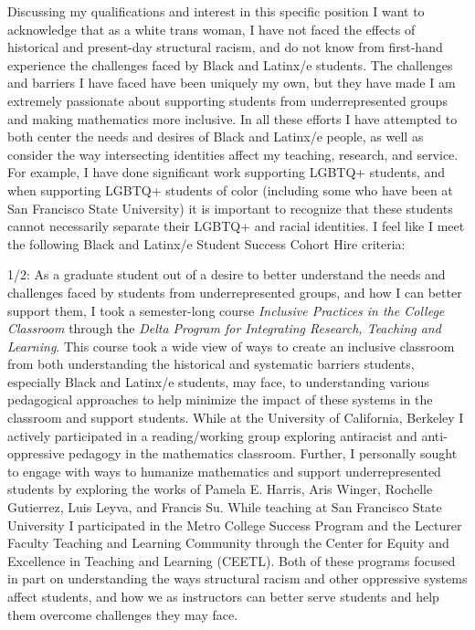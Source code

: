 \documentclass[11pt]{article}
\begin{document}
Discussing my qualifications and interest in this specific position I want to acknowledge that as a white trans woman, I have not faced the effects of historical and present-day structural racism, and do not know from first-hand experience the challenges faced by Black and Latinx/e students. The challenges and barriers I have faced have been uniquely my own, but they have made I am extremely passionate about supporting students from underrepresented groups and making mathematics more inclusive. In all these efforts I have attempted to both center the needs and desires of Black and Latinx/e people, as well as consider the way intersecting identities affect my teaching, research, and service. For example, I have done significant work supporting LGBTQ+ students, and when supporting LGBTQ+ students of color (including some who have been at San Francisco State University) it is important to recognize that these students cannot necessarily separate their LGBTQ+ and racial identities. I feel like I meet the following Black and Latinx/e Student Success Cohort Hire criteria:

1/2: As a graduate student out of a desire to better understand the needs and challenges faced by students from underrepresented groups, and how I can better support them, I took a semester-long course \textit{Inclusive Practices in the College Classroom} through the \textit{Delta Program for Integrating Research, Teaching and Learning}. This course took a wide view of ways to create an inclusive classroom from both understanding the historical and systematic barriers students, especially Black and Latinx/e students, may face, to understanding various pedagogical approaches to help minimize the impact of these systems in the classroom and support students. While at the University of California, Berkeley I actively participated in a reading/working group exploring antiracist and anti-oppressive pedagogy in the mathematics classroom. Further, I personally sought to engage with ways to humanize mathematics and support underrepresented students by exploring the works of Pamela E. Harris, Aris Winger, Rochelle Gutierrez, Luis Leyva, and Francis Su. While teaching at San Francisco State University I participated in the Metro College Success Program and the Lecturer Faculty Teaching and Learning Community through the Center for Equity and Excellence in Teaching and Learning (CEETL). Both of these programs focused in part on understanding the ways structural racism and other oppressive systems affect students, and how we as instructors can better serve students and help them overcome challenges they may face. 
\end{document}
